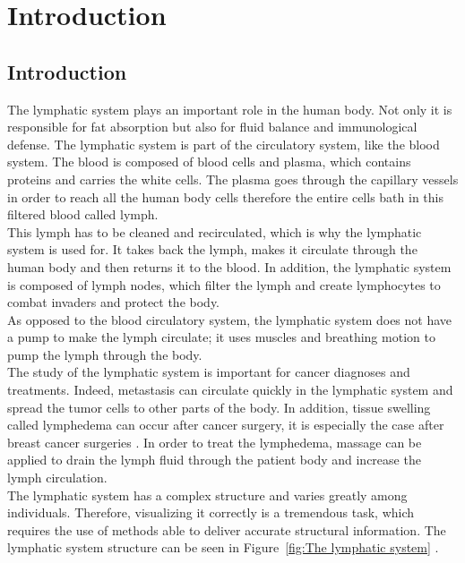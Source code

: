 
\chapter[Introduction]{Introduction}
\section{Introduction}

The lymphatic system plays an important role in the human body. Not only it is responsible for fat absorption but also for fluid balance and immunological defense. The lymphatic system is part of the circulatory system, like the blood system. The blood is composed of blood cells and plasma, which contains proteins and carries the white cells.  The plasma goes through the capillary vessels in order to reach all the human body cells therefore the entire cells bath in this filtered blood called lymph.  \\

This lymph has to be cleaned and recirculated, which is why the lymphatic system is used for. It takes back the lymph, makes it circulate through the human body and then returns it to the blood. In addition, the lymphatic system is composed of lymph nodes, which filter the lymph and create lymphocytes to combat invaders and protect the body. \\

As opposed to the blood circulatory system, the lymphatic system does not have a pump to make the lymph circulate; it uses muscles and breathing motion to pump the lymph through the body. \\

The study of the lymphatic system is important for cancer diagnoses and treatments. Indeed, metastasis can circulate quickly in the lymphatic system and spread the tumor cells to other parts of the body. In addition, tissue swelling called lymphedema can occur after cancer surgery, it is especially the case after breast cancer surgeries \cite{marshall_near-infrared_2010}. In order to treat the lymphedema, massage can be applied to drain the lymph fluid through the patient body and increase the lymph circulation. \\

The lymphatic system has a complex structure and varies greatly among individuals. Therefore, visualizing it correctly is a tremendous task, which requires the use of methods able to deliver accurate structural information.  The lymphatic system structure can be seen in Figure~\ref{fig:The lymphatic system} \cite{_lymphatic_????}.


